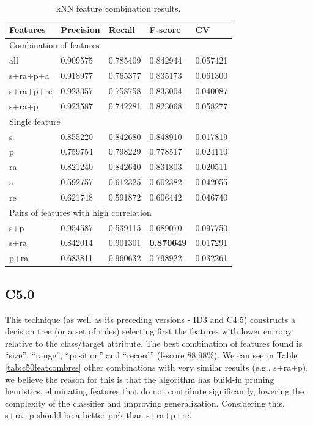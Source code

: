\begin{table}[h]
\centering
\caption{kNN feature combination results.}
\label{tab:knnfeatcombres}
\begin{tabular}{ | l | l | l | l | l |}
\hline
Features & Precision & Recall & F-score & CV \\
\hline
\multicolumn{5}{|l|}{Combination of features} \\
\hline
all      & 0.909575 & 0.785409 & 0.842944 & 0.057421 \\
s+ra+p+a & 0.918977 & 0.765377 & 0.835173 & 0.061300 \\
s+ra+p+re& 0.923357 & 0.758758 & 0.833004 & 0.040087 \\
s+ra+p   & 0.923587 & 0.742281 & 0.823068 & 0.058277 \\
\hline
\multicolumn{5}{|l|}{Single feature} \\
\hline
s  & 0.855220 & 0.842680 & 0.848910 & 0.017819 \\ 
p  & 0.759754 & 0.798229 & 0.778517 & 0.024110 \\
ra & 0.821240 & 0.842640 & 0.831803 & 0.020511 \\
a  & 0.592757 & 0.612325 & 0.602382 & 0.042055 \\
re & 0.621748 & 0.591872 & 0.606442 & 0.046740 \\
\hline
\multicolumn{5}{|l|}{Pairs of features with high correlation} \\
\hline
s+p      & 0.954587 & 0.539115 & 0.689070 & 0.097750 \\
s+ra     & 0.842014 & 0.901301 & \textbf{0.870649} & 0.017291 \\
p+ra     & 0.683811 & 0.960632 & 0.798922 & 0.032261 \\
\hline
\end{tabular}
\end{table}

\subsection{C5.0}\label{ss:c5}

This technique\cite{c5.0} (as well as its preceding versions - ID3\cite{id3} and
C4.5\cite{c4.5}) constructs a decision tree (or a set of rules) selecting first
the features with lower entropy relative to the class/target attribute.
The best combination of features found is ``size'', ``range'', ``position'' and
``record'' (f-score 88.98\%). We can see in Table \ref{tab:c50featcombres} other
combinations with very similar results (e.g., s+ra+p), we believe the reason for
this is that the algorithm has build-in pruning heuristics, eliminating features
that do not contribute significantly, lowering the complexity of the classifier
and improving generalization. Considering this, s+ra+p should be a better pick
than s+ra+p+re.

